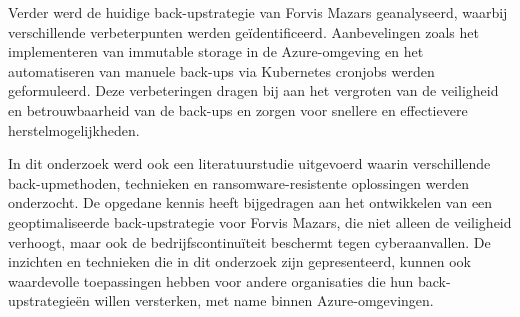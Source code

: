 Verder werd de huidige back-upstrategie van Forvis Mazars geanalyseerd, waarbij verschillende verbeterpunten werden geïdentificeerd. Aanbevelingen zoals het implementeren van immutable storage in de Azure-omgeving en het automatiseren van manuele back-ups via Kubernetes cronjobs werden geformuleerd. Deze verbeteringen dragen bij aan het vergroten van de veiligheid en betrouwbaarheid van de back-ups en zorgen voor snellere en effectievere herstelmogelijkheden.

In dit onderzoek werd ook een literatuurstudie uitgevoerd waarin verschillende back-upmethoden, technieken en ransomware-resistente oplossingen werden onderzocht. De opgedane kennis heeft bijgedragen aan het ontwikkelen van een geoptimaliseerde back-upstrategie voor Forvis Mazars, die niet alleen de veiligheid verhoogt, maar ook de bedrijfscontinuïteit beschermt tegen cyberaanvallen. De inzichten en technieken die in dit onderzoek zijn gepresenteerd, kunnen ook waardevolle toepassingen hebben voor andere organisaties die hun back-upstrategieën willen versterken, met name binnen Azure-omgevingen.
















